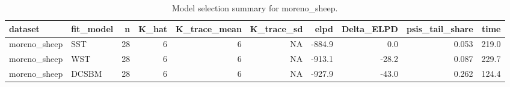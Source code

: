 \begin{table}

\caption{\label{tab:tab:model_selection_moreno_sheep}Model selection summary for moreno_sheep.}
\centering
\begin{tabular}[t]{llrrrrrrrr}
\toprule
dataset & fit\_model & n & K\_hat & K\_trace\_mean & K\_trace\_sd & elpd & Delta\_ELPD & psis\_tail\_share & time\\
\midrule
moreno\_sheep & SST & 28 & 6 & 6 & NA & -884.9 & 0.0 & 0.053 & 219.0\\
moreno\_sheep & WST & 28 & 6 & 6 & NA & -913.1 & -28.2 & 0.087 & 229.7\\
moreno\_sheep & DCSBM & 28 & 6 & 6 & NA & -927.9 & -43.0 & 0.262 & 124.4\\
\bottomrule
\end{tabular}
\end{table}
